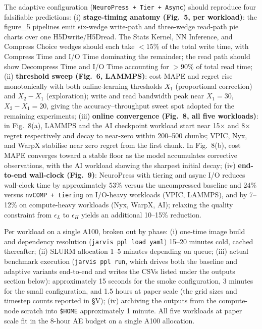 \documentclass[conference]{IEEEtran}
\begin{document}
\artexp
The adaptive configuration (\texttt{NeuroPress + Tier +
Async}) should reproduce four falsifiable predictions:
(i) \textbf{stage-timing anatomy (Fig.~5, per workload)}: the
figure\_5 pipelines emit six-wedge write-path and three-wedge
read-path pie charts over one H5Dwrite/H5Dread. The Stats
Kernel, NN Inference, and Compress Choice wedges should each
take $<15\%$ of the total write time, with Compress Time and
I/O Time dominating the remainder; the read path should show
Decompress Time and I/O Time accounting for $>90\%$ of total
read time;
(ii) \textbf{threshold sweep (Fig.~6, LAMMPS)}: cost MAPE and
regret rise monotonically with both online-learning thresholds
$X_1$ (proportional correction) and $X_2 - X_1$ (exploration);
write and read bandwidth peak near $X_1 = 30$, $X_2 - X_1 =
20$, giving the accuracy--throughput sweet spot adopted for
the remaining experiments;
(iii) \textbf{online convergence (Fig.~8, all five workloads)}:
in Fig.~8(a), LAMMPS and the AI checkpoint workload start
near 15$\times$ and 8$\times$ regret respectively and decay
to near-zero within 200--500 chunks; VPIC, Nyx, and WarpX
stabilise near zero regret from the first chunk. In
Fig.~8(b), cost MAPE converges toward a stable floor as the
model accumulates corrective observations, with the AI
workload showing the sharpest initial decay;
(iv) \textbf{end-to-end wall-clock (Fig.~9)}: NeuroPress with
tiering and async I/O reduces wall-clock time by
approximately 53\% versus the uncompressed baseline and 24\%
versus \texttt{nvCOMP + tiering} on I/O-heavy workloads
(VPIC, LAMMPS), and by 7--12\% on compute-heavy workloads
(Nyx, WarpX, AI); relaxing the quality constraint from
$\epsilon_L$ to $\epsilon_H$ yields an additional 10--15\%
reduction.

\arttime
Per workload on a single A100, broken out by phase:
(i) one-time image build and dependency resolution
(\texttt{jarvis ppl load yaml}) 15--20 minutes cold, cached
thereafter; (ii) SLURM allocation 1--5 minutes depending on
queue; (iii) actual benchmark execution (\texttt{jarvis ppl
run}, which drives both the baseline and adaptive variants
end-to-end and writes the CSVs listed under the outputs
section below):
approximately 15 seconds for the smoke configuration, 3
minutes for the small configuration, and 1.5 hours at paper
scale (the grid sizes and timestep counts reported in \S V);
(iv) archiving the outputs from the compute-node scratch into
\texttt{\$HOME} approximately 1 minute. All five workloads at
paper scale fit in the 8-hour AE budget on a single A100
allocation.
\end{document}
